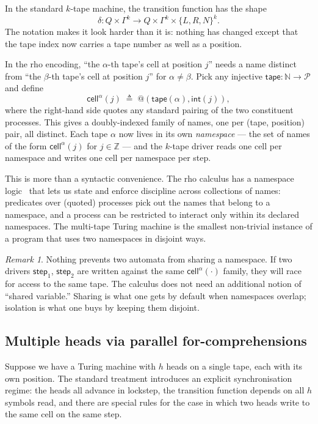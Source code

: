 \documentclass[11pt]{article}
\makeatletter
\theoremstyle{plain}
\theoremstyle{definition}
\theoremstyle{remark}
\newtheorem{remark}[theorem]{Remark}
\newcommand{\quo}[1]{@#1}
\newcommand{\Step}{\mathsf{step}}
\newcommand{\Cell}{\mathsf{cell}}
\newcommand{\Tap}{\Gamma}
\newcommand{\Procs}{\mathcal{P}}
\makeatother
\begin{document}
In the standard $k$-tape machine, the transition function has the shape
$$
\delta : Q \times \Tap^k \to Q \times \Tap^k \times \{L,R,N\}^k.
$$
\noindent The notation makes it look harder than it is: nothing has
changed except that the tape index now carries a tape number as well as a
position.

In the rho encoding, ``the $\alpha$-th tape's cell at position $j$''
needs a name distinct from ``the $\beta$-th tape's cell at position $j$''
for $\alpha \neq \beta$. Pick any injective $\mathsf{tape} : \mathbb{N}
\to \Procs$ and define
$$
\Cell^\alpha(j) \;\triangleq\; \quo{(\mathsf{tape}(\alpha), \mathsf{int}(j))},
$$
where the right-hand side quotes any standard pairing of the two
constituent processes. This gives a doubly-indexed family of names, one
per (tape, position) pair, all distinct. Each tape $\alpha$ now lives in
its own \emph{namespace} --- the set of names of the form $\Cell^\alpha(j)$
for $j \in \mathbb{Z}$ --- and the $k$-tape driver reads one cell per
namespace and writes one cell per namespace per step.

This is more than a syntactic convenience. The rho calculus has a
namespace logic~\cite{NamespaceLogic} that lets us state and enforce
discipline across collections of names: predicates over (quoted)
processes pick out the names that belong to a namespace, and a process
can be restricted to interact only within its declared namespaces. The
multi-tape Turing machine is the smallest non-trivial instance of a
program that uses two namespaces in disjoint ways.

\begin{remark}\label{rem:share}
Nothing prevents two automata from sharing a namespace. If two drivers
$\Step_1$, $\Step_2$ are written against the same $\Cell^\alpha(\cdot)$
family, they will race for access to the same tape. The calculus does
not need an additional notion of ``shared variable.'' Sharing is what one
gets by default when namespaces overlap; isolation is what one buys by
keeping them disjoint.
\end{remark}

\subsection{Multiple heads via parallel for-comprehensions}\label{sec:multihead}

Suppose we have a Turing machine with $h$ heads on a single tape, each
with its own position. The standard treatment introduces an explicit
synchronisation regime: the heads all advance in lockstep, the transition
function depends on all $h$ symbols read, and there are special rules for
the case in which two heads write to the same cell on the same step.
\end{document}

